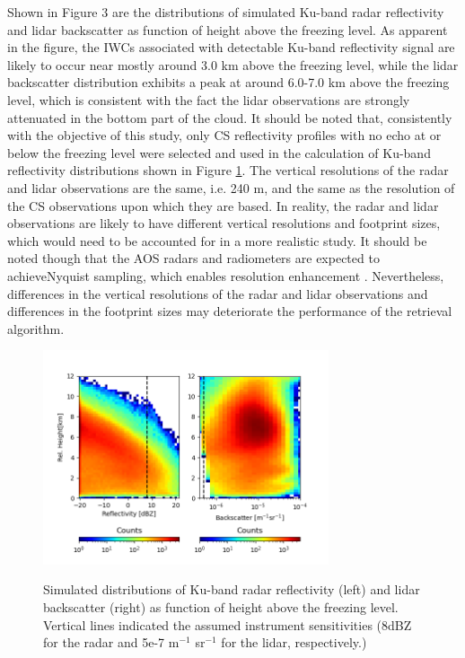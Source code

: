 \documentclass{ametsocV6.1}
\begin{document}
Shown in Figure 3 are the distributions of simulated Ku-band radar reflectivity and lidar backscatter as function of height above the freezing level. As apparent in the figure, the IWCs associated with detectable Ku-band reflectivity signal are likely to occur near mostly around 3.0 km above the freezing level, while the lidar backscatter distribution exhibits a peak at around 6.0-7.0 km above the freezing level, which is consistent with the fact the lidar observations are strongly attenuated in the bottom part of the cloud.  It should be noted that, consistently with the objective of this study, only CS reflectivity profiles with no echo at or below the freezing level were selected and used in the calculation of Ku-band reflectivity distributions shown in Figure \ref{f3}. The vertical resolutions of the radar and lidar observations are the same, i.e. 240 m, and the same as the resolution of the CS observations upon which they are based. In reality, the radar and lidar observations are likely to have different vertical resolutions and footprint sizes, which would need to be accounted for in a more realistic study.  It should be noted though that the AOS radars and radiometers are expected to achieveNyquist sampling, which enables resolution enhancement \citep{early2001image}.  Nevertheless, differences in the vertical resolutions of the radar and lidar observations and differences in the footprint sizes may deteriorate the performance of the retrieval algorithm.

\begin{figure}[t]
    \centering
    \includegraphics[width=0.75\textwidth,angle=0]{fig03.rev.png}\\
    \caption{Simulated distributions of Ku-band radar reflectivity (left) and lidar backscatter (right)
    as function of height above 
    the freezing level. Vertical lines indicated the assumed instrument sensitivities (8dBZ for the 
    radar and 5e-7 m$^{-1}$ sr$^{-1}$ for the lidar, respectively.) }\label{f3}
\end{figure}
\end{document}
